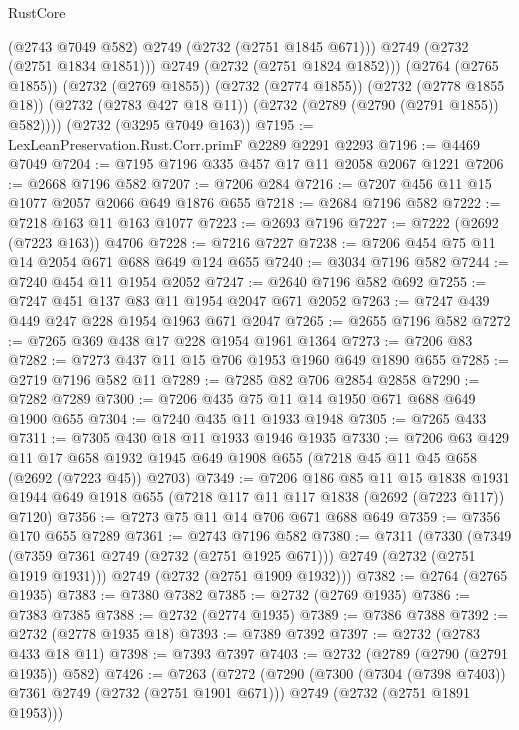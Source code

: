 \begin{lexlean}{RustCore}
\begin{coremodule}
              (@2743 @7049 @582)
              @2749
              (@2732 (@2751 @1845 @671)))
            @2749
            (@2732 (@2751 @1834 @1851)))
          @2749
          (@2732 (@2751 @1824 @1852)))
        (@2764 (@2765 @1855))
        (@2732 (@2769 @1855))
        (@2732 (@2774 @1855))
        (@2732 (@2778 @1855 @18))
        (@2732 (@2783 @427 @18 @11))
        (@2732 (@2789 (@2790 (@2791 @1855)) @582))))
    (@2732 (@3295 @7049 @163))
@7195 := LexLeanPreservation.Rust.Corr.primF @2289 @2291 @2293
@7196 := @4469 @7049
@7204 := @7195 @7196 @335 @457 @17 @11 @2058 @2067 @1221
@7206 := @2668 @7196 @582
@7207 := @7206 @284
@7216 := @7207 @456 @11 @15 @1077 @2057 @2066 @649 @1876 @655
@7218 := @2684 @7196 @582
@7222 := @7218 @163 @11 @163 @1077
@7223 := @2693 @7196
@7227 := @7222 (@2692 (@7223 @163)) @4706
@7228 := @7216 @7227
@7238 := @7206 @454 @75 @11 @14 @2054 @671 @688 @649 @124 @655
@7240 := @3034 @7196 @582
@7244 := @7240 @454 @11 @1954 @2052
@7247 := @2640 @7196 @582 @692
@7255 := @7247 @451 @137 @83 @11 @1954 @2047 @671 @2052
@7263 := @7247 @439 @449 @247 @228 @1954 @1963 @671 @2047
@7265 := @2655 @7196 @582
@7272 := @7265 @369 @438 @17 @228 @1954 @1961 @1364
@7273 := @7206 @83
@7282 := @7273 @437 @11 @15 @706 @1953 @1960 @649 @1890 @655
@7285 := @2719 @7196 @582 @11
@7289 := @7285 @82 @706 @2854 @2858
@7290 := @7282 @7289
@7300 := @7206 @435 @75 @11 @14 @1950 @671 @688 @649 @1900 @655
@7304 := @7240 @435 @11 @1933 @1948
@7305 := @7265 @433
@7311 := @7305 @430 @18 @11 @1933 @1946 @1935
@7330 := @7206
    @63
    @429
    @11
    @17
    @658
    @1932
    @1945
    @649
    @1908
    @655
    (@7218 @45 @11 @45 @658 (@2692 (@7223 @45)) @2703)
@7349 := @7206
    @186
    @85
    @11
    @15
    @1838
    @1931
    @1944
    @649
    @1918
    @655
    (@7218 @117 @11 @117 @1838 (@2692 (@7223 @117)) @7120)
@7356 := @7273 @75 @11 @14 @706 @671 @688 @649
@7359 := @7356 @170 @655 @7289
@7361 := @2743 @7196 @582
@7380 := @7311
    (@7330
      (@7349 (@7359 @7361 @2749 (@2732 (@2751 @1925 @671))) @2749 (@2732 (@2751 @1919 @1931)))
      @2749
      (@2732 (@2751 @1909 @1932)))
@7382 := @2764 (@2765 @1935)
@7383 := @7380 @7382
@7385 := @2732 (@2769 @1935)
@7386 := @7383 @7385
@7388 := @2732 (@2774 @1935)
@7389 := @7386 @7388
@7392 := @2732 (@2778 @1935 @18)
@7393 := @7389 @7392
@7397 := @2732 (@2783 @433 @18 @11)
@7398 := @7393 @7397
@7403 := @2732 (@2789 (@2790 (@2791 @1935)) @582)
@7426 := @7263
    (@7272
      (@7290
        (@7300 (@7304 (@7398 @7403)) @7361 @2749 (@2732 (@2751 @1901 @671)))
        @2749
        (@2732 (@2751 @1891 @1953)))

\end{coremodule}
\end{lexlean}
